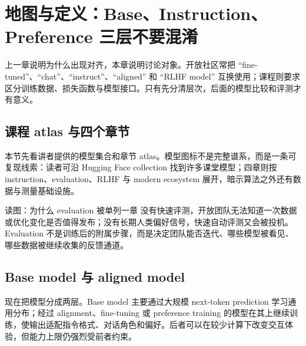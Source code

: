 \section{地图与定义：Base、Instruction、Preference 三层不要混淆}

上一章说明为什么出现对齐，本章说明讨论对象。开放社区常把 ``fine-tuned''、``chat''、``instruct''、``aligned'' 和 ``RLHF model'' 互换使用；课程则要求区分训练数据、损失函数与模型接口。只有先分清层次，后面的模型比较和评测才有意义。

\subsection{课程 atlas 与四个章节}

本节先看讲者提供的模型集合和章节 atlas。模型图标不是完整谱系，而是一条可复现线索：读者可沿 Hugging Face collection 找到许多课堂模型；四章则按 instruction、evaluation、RLHF 与 modern ecosystem 展开，暗示算法之外还有数据与测量基础设施。







\begin{knowledgebox}{读图：为什么 evaluation 被单列一章}
没有快速评测，开放团队无法知道一次数据或优化变化是否值得发布；没有长期人类偏好信号，快速自动评测又会被投机。Evaluation 不是训练后的附属步骤，而是决定团队能否迭代、哪些模型被看见、哪些数据被继续收集的反馈通道。
\end{knowledgebox}

\subsection{Base model 与 aligned model}

现在把模型分成两层。Base model 主要通过大规模 next-token prediction 学习通用分布；经过 alignment、fine-tuning 或 preference training 的模型在其上继续训练，使输出适配指令格式、对话角色和偏好。后者可以在较少计算下改变交互体验，但能力上限仍强烈受前者约束。

